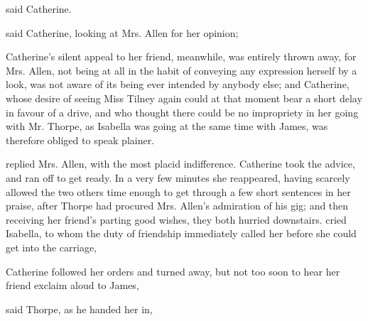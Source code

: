  said Catherine. 


 said Catherine, looking at Mrs. Allen for her opinion; 


Catherine's silent appeal to her friend, meanwhile, was entirely thrown away, for Mrs. Allen, not being at all in the habit of conveying any expression herself by a look, was not aware of its being ever intended by anybody else; and Catherine, whose desire of seeing Miss Tilney again could at that moment bear a short delay in favour of a drive, and who thought there could be no impropriety in her going with Mr. Thorpe, as Isabella was going at the same time with James, was therefore obliged to speak plainer. 

 replied Mrs. Allen, with the most placid indifference. Catherine took the advice, and ran off to get ready. In a very few minutes she reappeared, having scarcely allowed the two others time enough to get through a few short sentences in her praise, after Thorpe had procured Mrs. Allen's admiration of his gig; and then receiving her friend's parting good wishes, they both hurried downstairs.  cried Isabella, to whom the duty of friendship immediately called her before she could get into the carriage, 

Catherine followed her orders and turned away, but not too soon to hear her friend exclaim aloud to James, 

 said Thorpe, as he handed her in, 

